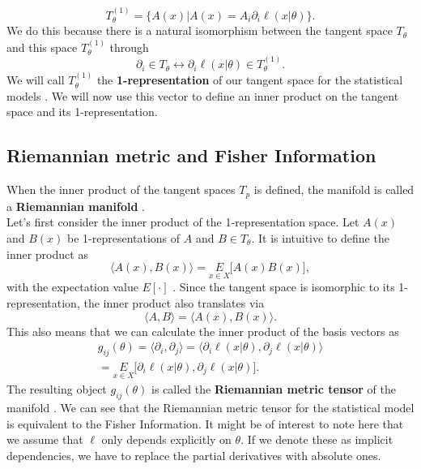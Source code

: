 \begin{equation}
	T_\theta^{(1)} = \{A(x) | A(x) = A_i \partial_i \ell(x|\theta)\}.
\end{equation}
We do this because there is a natural isomorphism between the tangent space $T_\theta$ and this space $T_\theta^{(1)}$ through \cite{AmarisLectureNotes}
\begin{equation}
	\partial_i \in T_\theta \leftrightarrow \partial_i \ell(x|\theta) \in T_\theta^{(1)}.
\end{equation}
We will call $T_\theta^{(1)}$ the \textbf{1-representation} of our tangent space for the statistical models \cite{AmarisLectureNotes}. We will now use this vector to define an inner product on the tangent space and its 1-representation.
\subsection{Riemannian metric and Fisher Information}\label{sec:RiemannianMetricAndFI}
When the inner product of the tangent spaces $T_p$ is defined, the manifold is called a \textbf{Riemannian manifold} \cite{AmarisLectureNotes}.\\
Let's first consider the inner product of the 1-representation space. Let $A(x)$ and $B(x)$ be 1-representations of $A$ and $B \in T_\theta$. It is intuitive to define the inner product as 
\begin{equation}
	\langle A(x), B(x) \rangle = \underset{x\in X}{E} \Big[A(x) B(x)\Big],
\end{equation}
with the expectation value $E[\cdot]$ \cite{AmarisLectureNotes}. Since the tangent space is isomorphic to its 1-representation, the inner product also translates via 
\begin{equation}
	\langle A, B \rangle = \langle A(x),B(x) \rangle.
\end{equation}
This also means that we can calculate the inner product of the basis vectors as \cite{AmarisLectureNotes}
\begin{equation}
	\begin{split}
		g_{ij}(\theta) = \langle \partial_i, \partial_j\rangle = \langle \partial_i\ell(x|\theta), \partial_j\ell(x|\theta)\rangle \\
		= \underset{x \in X}{E} \Big[\partial_i\ell(x|\theta), \partial_j\ell(x|\theta)\Big].
	\end{split}
\end{equation}
The resulting object $g_{ij}(\theta)$ is called the \textbf{Riemannian metric tensor} of the manifold \cite{AmarisLectureNotes}. We can see that the Riemannian metric tensor for the statistical model is equivalent to the Fisher Information. It might be of interest to note here that we assume that $\ell$ only depends explicitly on $\theta$. If we denote these as implicit dependencies, we have to replace the partial derivatives with absolute ones.\\
